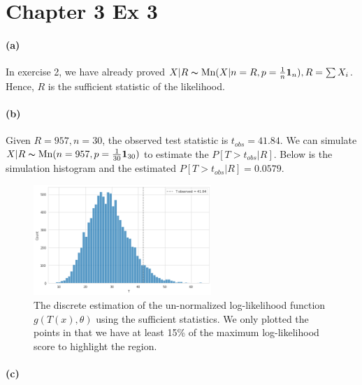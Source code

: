 \documentclass[11pt, letterpaper]{article}
\begin{document}
\section{Chapter 3 Ex 3}
\paragraph{(a)}
In exercise 2, we have already proved $X|R \thicksim \text{Mn}(X|n=R, p=\frac{1}{n}\mathbf{1}_n), R = \sum X_i$. Hence, $R$ is the sufficient statistic of the likelihood.

\paragraph{(b)}
Given $R=957, n=30$, the observed test statistic is $t_{obs} = 41.84$. We can simulate $X|R \thicksim \text{Mn}(n=957, p=\frac{1}{30}\mathbf{1}_{30})$ to estimate the $P[T>t_{obs}|R]$. Below is the simulation histogram and the estimated $P[T>t_{obs}|R] = 0.0579$.
\begin{figure}[!h]
  \centering
  \includegraphics[width=0.6\textwidth]{hw5-2.png}
  \captionsetup{justification=centering}
  \caption{The discrete estimation of the un-normalized log-likelihood function $g(T(x), \theta)$ using the sufficient statistics. We only plotted the points in that we have at least 15\% of the maximum log-likelihood score to highlight the region.}
  \label{fig:sufficient-logl}
\end{figure}

\paragraph{(c)}
\end{document}
